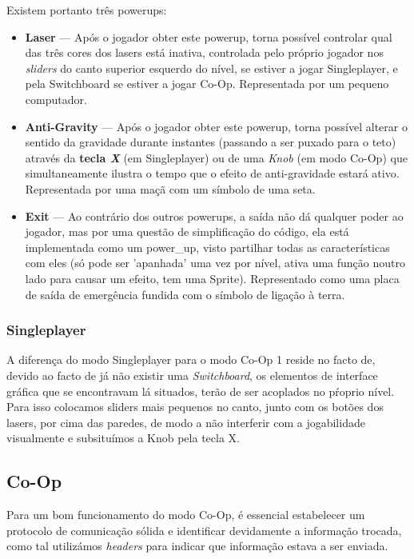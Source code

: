 \documentclass{report}
\begin{document}
Existem portanto três powerups:

\begin{itemize}
	\item \textbf{Laser} --- Após o jogador obter este powerup, torna possível controlar qual das três cores dos lasers está inativa, controlada pelo próprio jogador nos \textit{sliders} do canto superior esquerdo do nível, se estiver a jogar Singleplayer, e pela Switchboard se estiver a jogar Co-Op. Representada por um pequeno computador.

	\item \textbf{Anti-Gravity} --- Após o jogador obter este powerup, torna possível alterar o sentido da gravidade durante instantes (passando a ser puxado para o teto) através da \textbf{tecla \textit{X}} (em Singleplayer) ou de uma \textit{Knob}  (em  modo Co-Op) que simultaneamente ilustra o tempo que o efeito de anti-gravidade estará ativo. Representada por uma maçã com um símbolo de uma seta.

	\item \textbf{Exit} --- Ao contrário dos outros powerups, a saída não dá qualquer poder ao jogador, mas por uma questão de simplificação do código, ela está implementada como um power\_up, visto partilhar todas as características com eles (só pode ser 'apanhada' uma vez por nível, ativa uma função noutro lado para causar um efeito, tem uma Sprite). Representado como uma placa de saída de emergência fundida com o símbolo de ligação à terra.
\end{itemize}

\subsubsection{Singleplayer}

A diferença do modo Singleplayer para o modo Co-Op 1 reside no facto de, devido ao facto de já não existir uma \textit{Switchboard}, os elementos de interface gráfica que se encontravam lá situados, terão de ser acoplados no pŕoprio nível. Para isso colocamos sliders mais pequenos no canto, junto com os botões dos lasers, por cima das paredes, de modo a não interferir com a jogabilidade visualmente e subsituímos a Knob pela tecla X.

\subsection{Co-Op}

Para um bom funcionamento do modo Co-Op, é essencial estabelecer um protocolo de comunicação sólida e identificar devidamente a informação trocada, como tal utilizámos \textit{headers} para indicar que informação estava a ser enviada.
\end{document}
